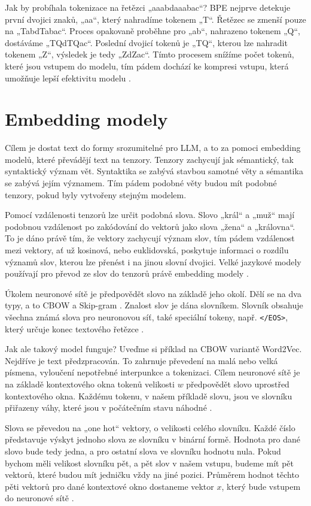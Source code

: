 \documentclass[FM,DP]{tulthesis}
\begin{document}
		Jak by probíhala tokenizace na řetězci „aaabdaaabac“? BPE nejprve detekuje první dvojici znaků, „aa“, který nahradíme tokenem „T“. Řetězec se zmenší pouze na „TabdTabac“. Proces opakovaně proběhne pro „ab“, nahrazeno tokenem „Q“, dostáváme „TQdTQac“. Poslední dvojicí tokenů je „TQ“, kterou lze nahradit tokenem „Z“, výsledek je tedy „ZdZac“. Tímto procesem snížíme počet tokenů, které jsou vstupem do modelu, tím pádem dochází ke kompresi vstupu, která umožňuje lepší efektivitu modelu \cite{rothman2021transformers}.
		
		\section{Embedding modely}
		Cílem je dostat text do formy srozumitelné pro LLM, a to za pomoci embedding modelů, které převádějí text na tenzory. Tenzory zachycují jak sémantický, tak syntaktický význam vět. Syntaktika se zabývá stavbou samotné věty a sémantika se zabývá jejím významem. Tím pádem podobné věty budou mít podobné tenzory, pokud byly vytvořeny stejným modelem.
		
		Pomocí vzdálenosti tenzorů lze určit podobná slova. Slovo „král“ a „muž“ mají podobnou vzdálenost po zakódování do vektorů jako slova „žena“ a „královna“. To je dáno právě tím, že vektory zachycují význam slov, tím pádem vzdálenost mezi vektory, ať už kosinová, nebo euklidovská, poskytuje informaci o rozdílu významů slov, kterou lze přenést i na jinou slovní dvojici. Velké jazykové modely používají pro převod ze slov do tenzorů právě embedding modely \cite{embeddings} \cite{embeddings2}.
		
		Úkolem neuronové sítě je předpovědět slovo na základě jeho okolí. Dělí se na dva typy, a to CBOW a Skip-gram \cite{embeddings}. Znalost slov je dána slovníkem. Slovník obsahuje všechna známá slova pro neuronovou síť, také speciální tokeny, např. \verb|</EOS>|, který určuje konec textového řetězce \cite{embeddings2}.
		
		Jak ale takový model funguje? Uveďme si příklad na CBOW variantě Word2Vec. Nejdříve je text předzpracován. To zahrnuje převedení na malá nebo velká písmena, vyloučení nepotřebné interpunkce a tokenizaci. Cílem neuronové sítě je na základě kontextového okna tokenů velikosti $w$ předpovědět slovo uprostřed kontextového okna. Každému tokenu, v našem příkladě slovu, jsou ve slovníku přiřazeny váhy, které jsou v počátečním stavu náhodné \cite{ytb:word2vec}. 
		
		Slova se převedou na „one hot“ vektory, o velikosti celého slovníku. Každé číslo představuje výskyt jednoho slova ze slovníku v binární formě. Hodnota pro dané slovo bude tedy jedna, a pro ostatní slova ve slovníku hodnotu nula. Pokud bychom měli velikost slovníku pět, a pět slov v našem vstupu, budeme mít pět vektorů, které budou mít jedničku vždy na jiné pozici. Průměrem hodnot těchto pěti vektorů pro dané kontextové okno dostaneme vektor $x$, který bude vstupem do neuronové sítě \cite{ytb:word2vec}.
		
\end{document}

